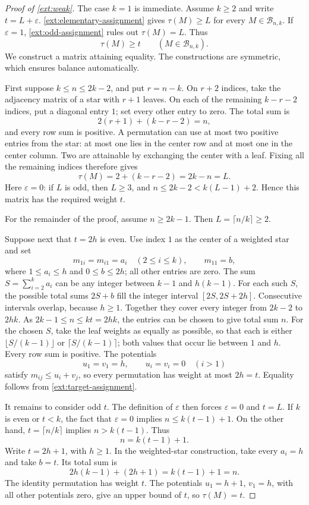 \documentclass[10pt,a4paper]{amsart}
\numberwithin{equation}{section}
\theoremstyle{definition}
\theoremstyle{remark}
\begin{document}
\begin{proof}[Proof of \cref{ext:weak}]
The case $k=1$ is immediate.  Assume $k\ge2$ and write
$t=L+\varepsilon$.  \cref{ext:elementary-assignment} gives
$\tau(M)\ge L$ for every $M\in\mathcal B_{n,k}$.  If
$\varepsilon=1$, \cref{ext:odd-assignment} rules out
$\tau(M)=L$.  Thus
\begin{equation}
\label{ext:target-assignment}
 \tau(M)\ge t\qquad(M\in\mathcal B_{n,k}).
\end{equation}
We construct a matrix attaining equality.  The constructions are
symmetric, which ensures balance automatically.

First suppose $k\le n\le2k-2$, and put $r=n-k$.  On $r+2$ indices,
take the adjacency matrix of a star with $r+1$ leaves.  On each of
the remaining $k-r-2$ indices, put a diagonal entry $1$; set every
other entry to zero.  The total sum is
\[
 2(r+1)+(k-r-2)=n,
\]
and every row sum is positive.  A permutation can use at most two
positive entries from the star: at most one lies in the center row
and at most one in the center column.  Two are attainable by
exchanging the center with a leaf.  Fixing all the remaining indices
therefore gives
\[
 \tau(M)=2+(k-r-2)=2k-n=L.
\]
Here $\varepsilon=0$: if $L$ is odd, then $L\ge3$, and
$n\le2k-2<k(L-1)+2$.  Hence this matrix has the required weight $t$.

For the remainder of the proof, assume $n\ge2k-1$.  Then
$L=\lceil n/k\rceil\ge2$.

Suppose next that $t=2h$ is even.  Use index $1$ as the center of a
weighted star and set
\[
 m_{1i}=m_{i1}=a_i\quad(2\le i\le k),\qquad m_{11}=b,
\]
where $1\le a_i\le h$ and $0\le b\le2h$; all other entries are zero.
The sum $S=\sum_{i=2}^k a_i$ can be any integer between $k-1$ and
$h(k-1)$.  For each such $S$, the possible total sums $2S+b$ fill the
integer interval $[2S,2S+2h]$.  Consecutive intervals overlap, because
$h\ge1$.  Together they cover every integer from $2k-2$ to $2hk$.
As $2k-1\le n\le kt=2hk$, the entries can be chosen to give total
sum $n$. For the chosen $S$, take the leaf weights as equally as
possible, so that each is either $\lfloor S/(k-1)\rfloor$ or
$\lceil S/(k-1)\rceil$; both values that occur lie between $1$ and $h$.
Every row sum is positive.  The potentials
\[
 u_1=v_1=h,\qquad u_i=v_i=0\quad(i>1)
\]
satisfy $m_{ij}\le u_i+v_j$, so every permutation has weight at most
$2h=t$.  Equality follows from \eqref{ext:target-assignment}.

It remains to consider odd $t$.  The definition of $\varepsilon$
then forces $\varepsilon=0$ and $t=L$.  If $k$ is even or $t<k$,
the fact that $\varepsilon=0$ implies $n\le k(t-1)+1$.  On the
other hand, $t=\lceil n/k\rceil$ implies $n>k(t-1)$.  Thus
\[
 n=k(t-1)+1.
\]
Write $t=2h+1$, with $h\ge1$.  In the weighted-star construction,
take every $a_i=h$ and take $b=t$.  Its total sum is
\[
 2h(k-1)+(2h+1)=k(t-1)+1=n.
\]
The identity permutation has weight $t$.  The potentials
$u_1=h+1$, $v_1=h$, with all other potentials zero, give an upper
bound of $t$, so $\tau(M)=t$.


\end{proof}
\end{document}
